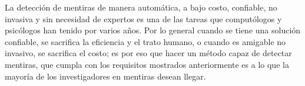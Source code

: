 \begin{onehalfspacing}
La detección de mentiras de manera automática, a bajo costo, confiable, no invasiva y sin necesidad de expertos es una de las tareas que computólogos y psicólogos han tenido por varios años. Por lo general cuando se tiene una solución confiable, se sacrifica la eficiencia y el trato humano, o cuando es amigable no invasivo, se sacrifica el costo; es por eso que hacer un método capaz de detectar mentiras, que cumpla con los requisitos mostrados anteriormente es a lo que la mayoría de los investigadores en mentiras desean llegar.

\end{onehalfspacing}
%